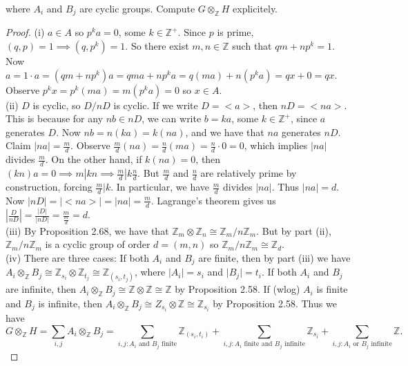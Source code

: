 \documentclass[8pt]{amsart}
\theoremstyle{plain}%
\theoremstyle{definition}
\theoremstyle{remark}
\numberwithin{equation}{section}
\newcommand{\Z}{\mathbb{Z}}
\newcommand{\D}{\displaystyle}
\begin{document}
where $A_i$ and $B_j$ are cyclic groups. Compute $G \otimes_{\Z}H$ explicitely. 
\begin{proof}
(i) $a \in A$ so $p^ka=0$, some $k \in \Z^+$. Since $p$ is prime, $(q,p)=1 \implies (q,p^k)=1$. So there exist $m,n \in \Z$ such that $qm+np^k=1$. Now $a=1\cdot a=(qm+np^k)a=qma+np^ka=q(ma)+n(p^ka)=qx+0=qx$. Observe $p^kx=p^k(ma)=m(p^ka)=0$ so $x\in A$.\\

(ii) $D$ is cyclic, so $D/nD$ is cyclic. If we write $D=<a>$, then $nD =<na>$. This is because for any $nb \in nD$, we can write $b=ka$, some $k\in \Z^+$, since $a$ generates $D$. Now $nb=n(ka)=k(na)$, and we have that $na$ generates $nD$. \\

Claim $|na|=\frac{m}{d}$. Observe $\frac{m}{d}(na)=\frac{n}{d}(ma)=\frac{n}{d}\cdot 0=0$, which implies $|na|$ divides $\frac{m}{d}$. On the other hand, if $k(na)=0$, then $(kn)a=0 \implies m|kn \implies \frac{m}{d}|k\frac{n}{d}$. But $\frac{m}{d}$ and $\frac{n}{d}$ are relatively prime by construction, forcing $\frac{m}{d}|k$. In particular, we have $\frac{m}{d}$ divides $|na|$. Thus $|na|=d$. Now $|nD|=|<na>|=|na|=\frac{m}{d}$. Lagrange's theorem gives us $|\frac{D}{nD}|=\frac{|D|}{|nD|}=\frac{m}{\frac{m}{d}}=d$. \\

(iii) By Proposition 2.68, we have that $\Z_m \otimes \Z_n \cong \Z_m/n\Z_m$. But by part (ii), $\Z_m/n\Z_m$ is a cyclic group of order $d=(m,n)$ so $\Z_m/n\Z_m \cong \Z_d$.\\

(iv) There are three cases: If both $A_i$ and $B_j$ are finite, then by part (iii) we have $A_i \otimes_\Z B_j \cong \Z_{s_i} \otimes \Z_{t_j} \cong \Z_{(s_i, t_j)}$, where $\vert A_i \vert = s_i$ and $\vert B_j \vert = t_i$. If both $A_i$ and $B_j$ are infinite, then $A_i \otimes_\Z B_j \cong \Z \otimes \Z \cong \Z$ by Proposition 2.58. If (wlog) $A_i$ is finite and $B_j$ is infinite, then $A_i \otimes_\Z B_j \cong Z_{s_i} \otimes \Z \cong \Z_{s_i}$ by Proposition 2.58. Thus we have $$G \otimes_\Z H = \D \sum_{i, j} A_i \otimes_\Z B_j = \sum_{i, j : A_i \text{ and } B_j \text{ finite}} \Z_{(s_i, t_i)} + \sum_{i, j : A_i \text{ finite and } B_j \text{ infinite}} \Z_{s_i}+ \sum_{i, j : A_i \text{ or } B_j \text{ infinite}}\Z.$$

\end{proof}
\end{document}
